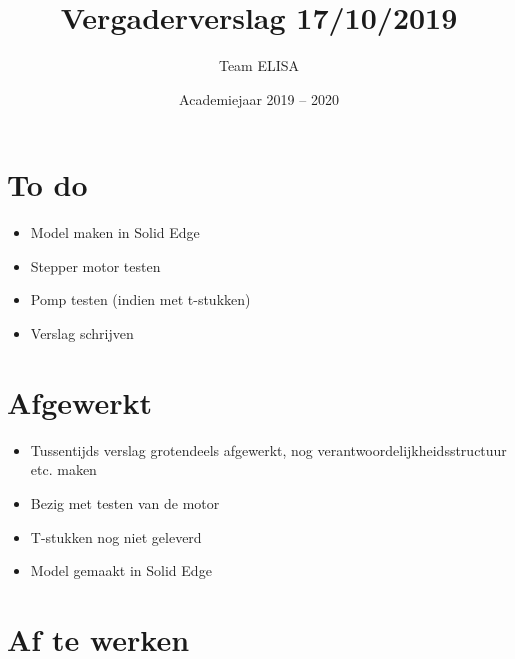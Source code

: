 \documentclass[a4paper,kulak]{kulakarticle} %
\date{Academiejaar 2019 -- 2020}
\title{Vergaderverslag 17/10/2019}
\author{Team ELISA}
\begin{document}
	
	\maketitle
	
	\section*{To do}
	
	\begin{itemize}
		\item Model maken in Solid Edge
		\item Stepper motor testen
		\item Pomp testen (indien met t-stukken)
		\item Verslag schrijven
		
	\end{itemize}
	
	\section*{Afgewerkt}
	\begin{itemize}
		\item Tussentijds verslag grotendeels afgewerkt, nog verantwoordelijkheidsstructuur etc. maken
		\item Bezig met testen van de motor
		\item T-stukken nog niet geleverd
		\item Model gemaakt in Solid Edge
	\end{itemize}
	
	\section*{Af te werken}
	
	
\end{document}
